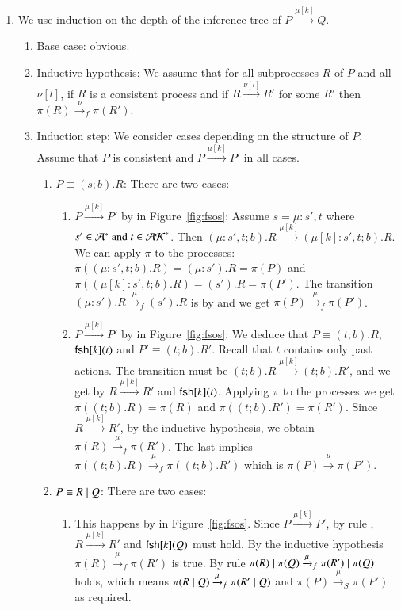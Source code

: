 \begin{pf}
\begin{enumerate}
\item We use induction on the depth of the inference tree of $P \xrightarrow{\mu[k]} Q$.
\begin{enumerate}
\item Base case: obvious.
\item Inductive hypothesis: We assume that for all subprocesses $R$ of $P$ and all $\nu[l]$, 
if $R$ is a consistent process and if $R \xrightarrow{\nu[l]} R'$ for some $R'$ then 
$\pi(R) \xrightarrow{\nu}_f \pi(R')$.
\item Induction step: We consider cases depending on the structure of $P$. 
Assume that $P$ is consistent and $P \xrightarrow{\mu[k]} P'$ in all cases.
\begin{enumerate}
\item $P\equiv (s;b).R$:
There are two cases:
\begin{enumerate}
\item  $P \xrightarrow{\mu[k]} P'$ by  in Figure~\ref{fig:fsos}: 
Assume $s=\mu:s',t$ where $s' \in \mathcal{A}^* \mbox{ and } t \in \mathcal{AK}^*$. Then $(\mu:s',t;b).R \xrightarrow{\mu[k]} (\mu[k]:s',t;b).R$. We can apply $\pi$ to the processes: $\pi((\mu:s',t;b).R)=(\mu:s').R=\pi(P)$  and $\pi((\mu[k]:s',t;b).R)=(s').R=\pi(P')$. The transition $(\mu:s').R \xrightarrow{\mu}_f (s').R$ is by  
and we get $\pi(P) \xrightarrow{\mu}_f \pi(P')$.

\item  $P \xrightarrow{\mu[k]} P'$ by  in Figure~\ref{fig:fsos}: We deduce that $P \equiv (t;b).R$, $\mathsf{fsh}[k](t)$ and $P' \equiv(t;b).R'$. Recall that $t$ contains only past actions. The transition must be $(t;b).R \xrightarrow{\mu[k]} (t;b).R'$, and we get by  $R \xrightarrow{\mu[k]} R'$ and $\mathsf{fsh}[k](t)$. Applying $\pi$ to the processes we get $\pi((t;b).R)=\pi(R)$ and $\pi((t;b).R')=\pi(R')$. Since $R \xrightarrow{\mu[k]} R'$, by the inductive hypothesis, we obtain $\pi(R) \xrightarrow{\mu}_f \pi(R')$. The last implies $\pi((t;b).R) \xrightarrow{\mu}_f \pi((t;b).R')$ which is $\pi(P) \xrightarrow{\mu} \pi(P')$.
\end{enumerate}
\item $P \equiv R \; \vert \; Q$:
There are two cases:
\begin{enumerate}

\item This happens by  in Figure~\ref{fig:fsos}. Since $P \xrightarrow{\mu[k]} P'$, by rule , $R \xrightarrow{\mu[k]} R'$ and $\mathsf{fsh}[k](Q)$ must hold. By the inductive hypothesis $\pi(R) \xrightarrow{\mu}_f \pi(R')$ is true. By rule  $\pi(R) \; \vert \; \pi(Q) \xrightarrow{\mu}_f \pi(R') \; \vert \; \pi(Q)$ holds, which means $\pi(R \; \vert \; Q) \xrightarrow{\mu}_f \pi(R' \; \vert \; Q)$ and $\pi(P) \xrightarrow{\mu}_S \pi(P')$ as required.


\end{enumerate}
\end{enumerate}
\end{enumerate}
\end{enumerate}
\end{pf}
